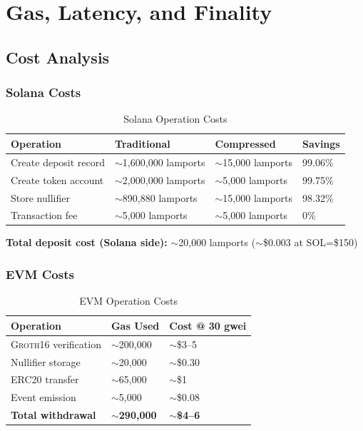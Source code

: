 \documentclass[11pt,a4paper,twoside]{article}
\newcommand{\groth}{\textsc{Groth16}}
\begin{document}
\section{Gas, Latency, and Finality}
\label{sec:performance}

\subsection{Cost Analysis}

\subsubsection{Solana Costs}

\begin{table}[H]
\centering
\caption{Solana Operation Costs}
\label{tab:solana-costs}
\begin{tabular}{@{}llll@{}}
\toprule
\textbf{Operation} & \textbf{Traditional} & \textbf{Compressed} & \textbf{Savings} \\
\midrule
Create deposit record & $\sim$1,600,000 lamports & $\sim$15,000 lamports & 99.06\% \\
Create token account & $\sim$2,000,000 lamports & $\sim$5,000 lamports & 99.75\% \\
Store nullifier & $\sim$890,880 lamports & $\sim$15,000 lamports & 98.32\% \\
Transaction fee & $\sim$5,000 lamports & $\sim$5,000 lamports & 0\% \\
\bottomrule
\end{tabular}
\end{table}

\textbf{Total deposit cost (Solana side):} $\sim$20,000 lamports ($\sim$\$0.003 at SOL=\$150)

\subsubsection{EVM Costs}

\begin{table}[H]
\centering
\caption{EVM Operation Costs}
\label{tab:evm-costs}
\begin{tabular}{@{}lll@{}}
\toprule
\textbf{Operation} & \textbf{Gas Used} & \textbf{Cost @ 30 gwei} \\
\midrule
\groth{} verification & $\sim$200,000 & $\sim$\$3--5 \\
Nullifier storage & $\sim$20,000 & $\sim$\$0.30 \\
ERC20 transfer & $\sim$65,000 & $\sim$\$1 \\
Event emission & $\sim$5,000 & $\sim$\$0.08 \\
\midrule
\textbf{Total withdrawal} & $\sim$\textbf{290,000} & $\sim$\textbf{\$4--6} \\
\bottomrule
\end{tabular}
\end{table}
\end{document}
